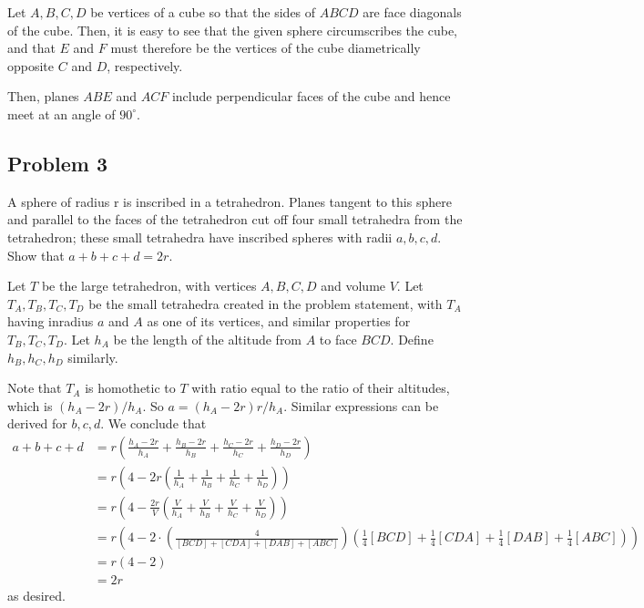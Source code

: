 \begin{mdsoln}
Let $A,B,C,D$ be vertices of a cube so that the sides of $ABCD$ are face diagonals of the cube. Then, it is easy to see that the given sphere circumscribes the cube, and that $E$ and $F$ must therefore be the vertices of the cube diametrically opposite $C$ and $D$, respectively.

Then, planes $ABE$ and $ACF$ include perpendicular faces of the cube and hence meet at an angle of $90^\circ$.    
\end{mdsoln}

\subsection{Problem 3}

A sphere of radius r is inscribed in a tetrahedron. Planes tangent to this sphere and parallel to the faces of the tetrahedron cut off four small tetrahedra from the tetrahedron; these small tetrahedra have inscribed spheres with radii $a,b,c,d$. Show that $a + b + c + d = 2r$.

\begin{mdsoln}
Let $T$ be the large tetrahedron, with vertices $A,B,C,D$ and volume $V$. Let $T_A,T_B,T_C,T_D$ be the small tetrahedra created in the problem statement, with $T_A$ having inradius $a$ and $A$ as one of its vertices, and similar properties for $T_B,T_C,T_D$. Let $h_A $ be the length of the altitude from $A$ to face $BCD$. Define $h_B,h_C,h_D$ similarly.

Note that $T_A$ is homothetic to $T$ with ratio equal to the ratio of their altitudes, which is $(h_A-2r)/h_A$. So $a=(h_A-2r)r/h_A$. Similar expressions can be derived for $b,c,d$. We conclude that\begin{align*} a+b+c+d&=r\left(\frac{h_A-2r}{h_A}+\frac{h_B-2r}{h_B}+\frac{h_C-2r}{h_C}+\frac{h_D-2r}{h_D}\right)\\ &=r\left(4-2r\left(\frac{1}{h_A}+\frac{1}{h_B}+\frac{1}{h_C}+\frac{1}{h_D}\right)\right)\\ &=r\left(4-\frac{2r}{V}\left(\frac{V}{h_A}+\frac{V}{h_B}+\frac{V}{h_C}+\frac{V}{h_D}\right)\right)\\ &=r\left(4-2\cdot\left(\frac{4}{[BCD]+[CDA]+[DAB]+[ABC]}\right)\left(\frac{1}{4}[BCD]+\frac{1}{4}[CDA]+\frac{1}{4}[DAB]+\frac{1}{4}[ABC]\right)\right)\\ &=r\left(4-2\right)\\ &=2r\end{align*}as desired.    
\end{mdsoln}

